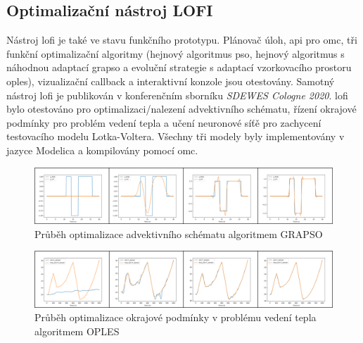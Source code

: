 \subsection{Optimalizační nástroj LOFI}
Nástroj \acrshort{lofi} je také ve stavu funkčního prototypu. Plánovač úloh,
\acrshort{api} pro \acrshort{omc}, tři funkční optimalizační algoritmy (hejnový
algoritmus \acrshort{pso}, hejnový algoritmus s náhodnou adaptací
\acrshort{grapso} a evoluční strategie s adaptací vzorkovacího prostoru
\acrshort{oples}), vizualizační callback a interaktivní konzole jsou otestovány.
Samotný nástroj \acrshort{lofi} je publikován v konferenčním sborníku
\textit{SDEWES Cologne 2020}. \acrshort{lofi} bylo otestováno pro
optimalizaci/nalezení advektivního schématu, řízení okrajové podmínky pro
problém vedení tepla a učení neuronové síťě pro zachycení testovacího modelu
Lotka-Voltera. Všechny tři modely byly implementovány v jazyce Modelica a
kompilovány pomocí \acrshort{omc}. 
\begin{figure}[h]
\begin{center}
  \includegraphics[width=\textwidth]{figures/Advection_GRAPSO}
\end{center}
\caption{Průběh optimalizace advektivního schématu algoritmem GRAPSO}
\label{fig:Advection_GRAPSO}
\end{figure}
\begin{figure}[h]
\begin{center}
  \includegraphics[width=\textwidth]{figures/Inverse_OPLES}
\end{center}
\caption{Průběh optimalizace okrajové podmínky v problému vedení tepla
algoritmem OPLES}
\label{fig:Inverse_OPLES}
\end{figure}
